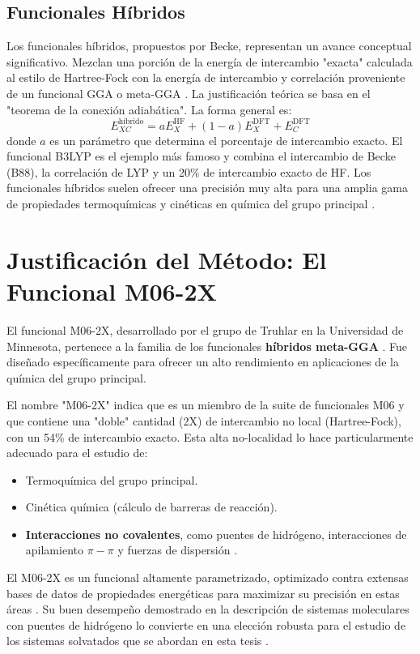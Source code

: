 \subsection{Funcionales Híbridos}
Los funcionales híbridos, propuestos por Becke, representan un avance conceptual significativo. Mezclan una porción de la energía de intercambio "exacta" calculada al estilo de Hartree-Fock con la energía de intercambio y correlación proveniente de un funcional GGA o meta-GGA \cite[273]{jensen2017introduction}. La justificación teórica se basa en el "teorema de la conexión adiabática". La forma general es:
$$ E_{XC}^{\text{híbrido}} = a E_X^{\text{HF}} + (1-a) E_X^{\text{DFT}} + E_C^{\text{DFT}} $$
donde $a$ es un parámetro que determina el porcentaje de intercambio exacto. El funcional B3LYP es el ejemplo más famoso y combina el intercambio de Becke (B88), la correlación de LYP y un 20\% de intercambio exacto de HF. Los funcionales híbridos suelen ofrecer una precisión muy alta para una amplia gama de propiedades termoquímicas y cinéticas en química del grupo principal \cite[99]{koch2015chemist}.

\section{Justificación del Método: El Funcional M06-2X}
El funcional M06-2X, desarrollado por el grupo de Truhlar en la Universidad de Minnesota, pertenece a la familia de los funcionales \textbf{híbridos meta-GGA} \cite[1]{DFT-2008-01}. Fue diseñado específicamente para ofrecer un alto rendimiento en aplicaciones de la química del grupo principal.

El nombre "M06-2X" indica que es un miembro de la suite de funcionales M06 y que contiene una "doble" cantidad (2X) de intercambio no local (Hartree-Fock), con un 54\% de intercambio exacto. Esta alta no-localidad lo hace particularmente adecuado para el estudio de:
\begin{itemize}
    \item Termoquímica del grupo principal.
    \item Cinética química (cálculo de barreras de reacción).
    \item \textbf{Interacciones no covalentes}, como puentes de hidrógeno, interacciones de apilamiento $\pi-\pi$ y fuerzas de dispersión \cite[2]{Me-2025-01}.
\end{itemize}
El M06-2X es un funcional altamente parametrizado, optimizado contra extensas bases de datos de propiedades energéticas para maximizar su precisión en estas áreas \cite[3, 24]{DFT-2008-01}. Su buen desempeño demostrado en la descripción de sistemas moleculares con puentes de hidrógeno lo convierte en una elección robusta para el estudio de los sistemas solvatados que se abordan en esta tesis \cite[2]{Me-2025-01}.

